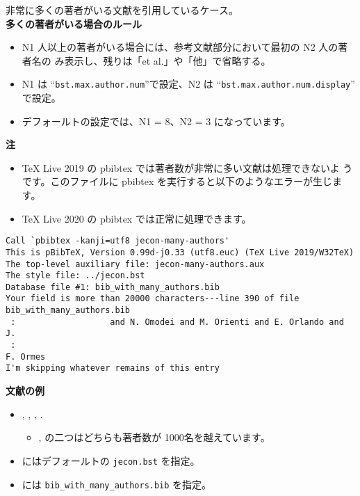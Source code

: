 \documentclass[10pt]{jarticle}
\begin{document}
非常に多くの著者がいる文献を引用しているケース。
\vspace*{1em} \\

\textbf{多くの著者がいる場合のルール}
\begin{itemize}
 \item N1 人以上の著者がいる場合には、参考文献部分において最初の N2 人の著者名の
       み表示し、残りは「et al.」や「他」で省略する。
 \item N1 は ``\texttt{bst.max.author.num}''で設定、N2 は
       ``\texttt{bst.max.author.num.display}'' で設定。
 \item デフォールトの設定では、N1 = 8、N2 = 3 になっています。
\end{itemize}

\vspace*{1em}

\textbf{注}
\begin{itemize}
 \item TeX Live 2019 の pbibtex では著者数が非常に多い文献は処理できないよ
       うです。このファイルに pbibtex を実行すると以下のようなエラーが生じます。
 \item TeX Live 2020 の pbibtex では正常に処理できます。
\end{itemize}

\small       
\begin{screen}
\begin{verbatim}
Call `pbibtex -kanji=utf8 jecon-many-authors'
This is pBibTeX, Version 0.99d-j0.33 (utf8.euc) (TeX Live 2019/W32TeX)
The top-level auxiliary file: jecon-many-authors.aux
The style file: ../jecon.bst
Database file #1: bib_with_many_authors.bib
Your field is more than 20000 characters---line 390 of file bib_with_many_authors.bib
 :                   and N. Omodei and M. Orienti and E. Orlando and J. 
 :                                                                      F. Ormes
I'm skipping whatever remains of this entry
\end{verbatim}
\end{screen}
\normalsize

\vspace*{1em}

\textbf{文献の例}
\begin{itemize}
 \item \citet{haigan_2019},
       \citet{130004469434},
       \citet{Abbott_2016},
       \citet{Aad_20121}.
       \begin{itemize}
        \item \citet{Abbott_2016}, \citet{Aad_20121} の二つはどちらも著者数が
              1000名を越えています。
       \end{itemize}
 \item \verb|| にはデフォールトの \verb|jecon.bst| を指定。
 \item \verb|| には \verb|bib_with_many_authors.bib| を指定。
\end{itemize}

%


%

\end{document}
